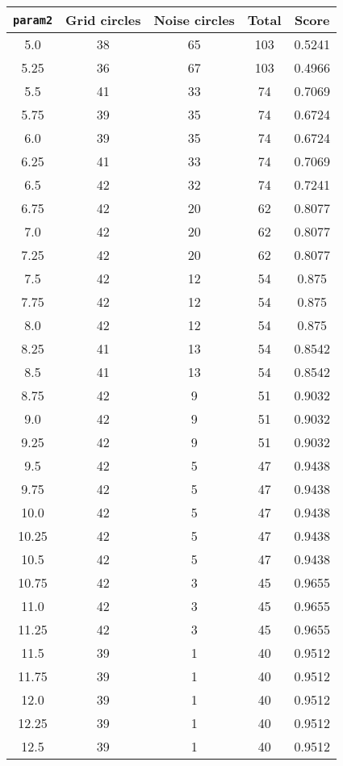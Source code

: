 \documentclass[letterpaper, 12pt]{article}
\begin{document}
\begin{longtable}{|c|c|c|c|c|}
\hline
\textbf{\texttt{param2}} & \textbf{Grid circles} & \textbf{Noise circles} & \textbf{Total} & \textbf{Score} \\
\hline
5.0 & 38 & 65 & 103 & 0.5241 \\
\hline
5.25 & 36 & 67 & 103 & 0.4966 \\
\hline
5.5 & 41 & 33 & 74 & 0.7069 \\
\hline
5.75 & 39 & 35 & 74 & 0.6724 \\
\hline
6.0 & 39 & 35 & 74 & 0.6724 \\
\hline
6.25 & 41 & 33 & 74 & 0.7069 \\
\hline
6.5 & 42 & 32 & 74 & 0.7241 \\
\hline
6.75 & 42 & 20 & 62 & 0.8077 \\
\hline
7.0 & 42 & 20 & 62 & 0.8077 \\
\hline
7.25 & 42 & 20 & 62 & 0.8077 \\
\hline
7.5 & 42 & 12 & 54 & 0.875 \\
\hline
7.75 & 42 & 12 & 54 & 0.875 \\
\hline
8.0 & 42 & 12 & 54 & 0.875 \\
\hline
8.25 & 41 & 13 & 54 & 0.8542 \\
\hline
8.5 & 41 & 13 & 54 & 0.8542 \\
\hline
8.75 & 42 & 9 & 51 & 0.9032 \\
\hline
9.0 & 42 & 9 & 51 & 0.9032 \\
\hline
9.25 & 42 & 9 & 51 & 0.9032 \\
\hline
9.5 & 42 & 5 & 47 & 0.9438 \\
\hline
9.75 & 42 & 5 & 47 & 0.9438 \\
\hline
10.0 & 42 & 5 & 47 & 0.9438 \\
\hline
10.25 & 42 & 5 & 47 & 0.9438 \\
\hline
10.5 & 42 & 5 & 47 & 0.9438 \\
\hline
10.75 & 42 & 3 & 45 & 0.9655 \\
\hline
11.0 & 42 & 3 & 45 & 0.9655 \\
\hline
11.25 & 42 & 3 & 45 & 0.9655 \\
\hline
11.5 & 39 & 1 & 40 & 0.9512 \\
\hline
11.75 & 39 & 1 & 40 & 0.9512 \\
\hline
12.0 & 39 & 1 & 40 & 0.9512 \\
\hline
12.25 & 39 & 1 & 40 & 0.9512 \\
\hline
12.5 & 39 & 1 & 40 & 0.9512 \\

\end{longtable}
\end{document}
